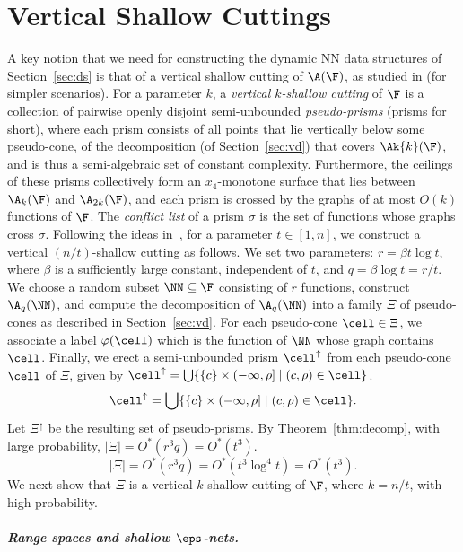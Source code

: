 \section{Vertical Shallow Cuttings} \label{sec:shallow}
%
A key notion that we need for constructing the dynamic NN data structures of Section~\ref{sec:ds}
is that of a vertical shallow cutting of $\A(\F)$, 
as studied in \cite{Chan:le,CT16,KMRSS} (for simpler scenarios). For a parameter $k$, a 
\emph{vertical $k$-shallow cutting} of $\F$ is a collection of pairwise openly disjoint 
semi-unbounded \emph{pseudo-prisms} (prisms for short), where each prism consists of all points 
that lie vertically below some pseudo-cone, of the decomposition (of Section~\ref{sec:vd}) 
that covers $\Ak{k} (\F)$,
and is thus a semi-algebraic set of constant complexity. 
Furthermore, the ceilings of these prisms collectively form an $x_4$-monotone surface that lies 
between $\A_k(\F)$ and $\A_{2k}(\F)$, and each prism is crossed by the graphs of at most 
$O(k)$ functions of $\F$. The \emph{conflict list} of a prism $\sigma$ is the set of 
functions whose graphs cross $\sigma$.
%
Following the ideas in~\cite{KMRSS}, for a parameter $t \in [1,n]$,
we construct a vertical $(n/t)$-shallow cutting as follows.
We set two parameters: $r=\beta t \log t$, where $\beta$ is a sufficiently large constant, independent
of $t$, and $q=\beta \log t = r/t$. We choose a random subset $\NN \subseteq \F$ consisting of $r$ functions,
construct $\A_q(\NN)$, and compute the decomposition of $\A_q(\NN)$ into a family $\Xi$ of pseudo-cones 
as described in Section~\ref{sec:vd}. For each pseudo-cone $\cell \in \Xi$, we associate a label 
$\varphi(\cell)$ which is the function of $\NN$ whose graph contains $\cell$. Finally, we erect a 
semi-unbounded prism $\cell^\uparrow$ from each pseudo-cone $\cell$ of $\Xi$, given by
\ifsocgproc
$\cell^\uparrow = \bigcup \{ \{c\} \times(-\infty, \rho] \mid (c,\rho) \in \cell\}$.
\else
\[
\cell^\uparrow = \bigcup \{ \{c\} \times(-\infty, \rho] \mid (c,\rho) \in \cell\}.
\] 
\fi
Let $\Xi^\uparrow$ be the resulting set of pseudo-prisms. By Theorem~\ref{thm:decomp}, with large probability,
\ifsocgproc
$|\Xi| = O^*(r^3q) =  O^*(t^3)$.
\else
\[
|\Xi| = O^*(r^3q) = O^*(t^3\log^4t) = O^*(t^3).
\]
\fi
We next show that $\Xi$ is a vertical $k$-shallow cutting of $\F$, where $k = n/t$, with high probability.
%
\ifsocgproc 
\subparagraph*{Range spaces and shallow $\eps$-nets.}
\else
